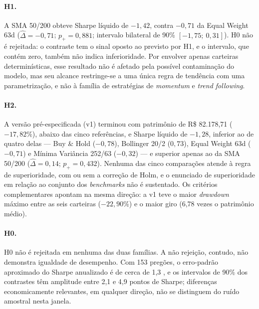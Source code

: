 \documentclass{eic-bcc-tcc}
\begin{document}
\paragraph{H1.} A SMA 50/200 obteve Sharpe líquido de $-1{,}42$, contra $-0{,}71$ da Equal Weight 63d ($\hat{\Delta} = -0{,}71$; $p_{+} = 0{,}881$; intervalo bilateral de 90\% $[-1{,}75;\ 0{,}31]$). H0 não é rejeitada: o contraste tem o sinal oposto ao previsto por H1, e o intervalo, que contém zero, também não indica inferioridade. Por envolver apenas carteiras determinísticas, esse resultado não é afetado pela possível contaminação do modelo, mas seu alcance restringe-se a uma única regra de tendência com uma parametrização, e não à família de estratégias de \textit{momentum} e \textit{trend following}.

\paragraph{H2.} A versão pré-especificada (v1) terminou com patrimônio de R\$ 82.178,71 ($-17{,}82\%$), abaixo das cinco referências, e Sharpe líquido de $-1{,}28$, inferior ao de quatro delas --- Buy \& Hold ($-0{,}78$), Bollinger 20/2 ($0{,}73$), Equal Weight 63d ($-0{,}71$) e Mínima Variância 252/63 ($-0{,}32$) --- e superior apenas ao da SMA 50/200 ($\hat{\Delta} = 0{,}14$; $p_{+} = 0{,}432$). Nenhuma das cinco comparações atende à regra de superioridade, com ou sem a correção de Holm, e o enunciado de superioridade em relação ao conjunto dos \textit{benchmarks} não é sustentado. Os critérios complementares apontam na mesma direção: a v1 teve o maior \textit{drawdown} máximo entre as seis carteiras ($-22{,}90\%$) e o maior giro (6,78 vezes o patrimônio médio).

\paragraph{H0.} H0 não é rejeitada em nenhuma das duas famílias. A não rejeição, contudo, não demonstra igualdade de desempenho. Com 153 pregões, o erro-padrão aproximado do Sharpe anualizado é de cerca de 1,3 \citep{Lo2002}, e os intervalos de 90\% dos contrastes têm amplitude entre 2,1 e 4,9 pontos de Sharpe; diferenças economicamente relevantes, em qualquer direção, não se distinguem do ruído amostral nesta janela.
\end{document}
